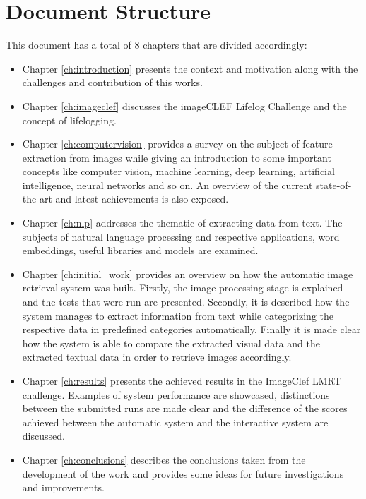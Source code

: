 \section{Document Structure}
This document has a total of 8 chapters that are divided accordingly:




\begin{itemize}
  \item Chapter \ref{ch:introduction} presents the context and motivation along with the challenges and contribution of this works.
  \item Chapter \ref{ch:imageclef} discusses the imageCLEF Lifelog Challenge and the concept of lifelogging.
  \item Chapter \ref{ch:computervision} provides a survey on the subject of feature extraction from images while giving an introduction to some important concepts like computer vision, machine learning, deep learning, artificial intelligence, neural networks and so on. An overview of the current state-of-the-art and latest achievements is also exposed.
  
  \item Chapter \ref{ch:nlp} addresses the thematic of extracting data from text. The subjects of natural language processing and respective applications, word embeddings, useful libraries and models are examined.  
  
  
  \item Chapter \ref{ch:initial_work} provides an overview on how the automatic image retrieval system was built. Firstly, the image processing stage is explained and the tests that were run are presented. Secondly, it is described how the system manages to extract information from text while categorizing the respective data in predefined categories automatically. Finally it is made clear how the system is able to compare the extracted visual data and the extracted textual data in order to retrieve images accordingly.
  


  \item Chapter \ref{ch:results} presents the achieved results in the ImageClef LMRT challenge. Examples of system performance are showcased, distinctions between the submitted runs are made clear and the difference of the scores achieved between the automatic system and the interactive system are discussed.
  
  \item Chapter \ref{ch:conclusions} describes the conclusions taken from the development of the work and provides some ideas for future investigations and improvements.
  
 
 
\end{itemize}

